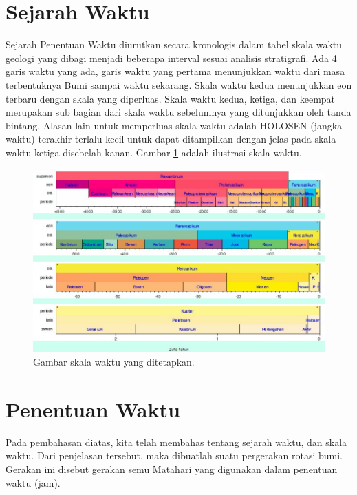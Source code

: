 

\section{Sejarah Waktu}

Sejarah Penentuan Waktu diurutkan secara kronologis dalam tabel skala waktu geologi 
yang dibagi menjadi beberapa interval sesuai analisis stratigrafi. 
Ada 4 garis waktu yang ada, garis waktu yang pertama menunjukkan waktu dari masa terbentuknya Bumi sampai waktu sekarang\cite{suryasejarah}.  Skala waktu kedua menunjukkan eon terbaru dengan skala yang diperluas. Skala waktu kedua, ketiga, dan keempat merupakan sub bagian dari skala waktu sebelumnya yang ditunjukkan oleh tanda bintang. 
Alasan lain untuk memperluas skala waktu adalah HOLOSEN (jangka waktu) terakhir terlalu kecil untuk dapat ditampilkan dengan jelas
pada skala waktu ketiga disebelah kanan. Gambar \ref{sejarahpenentuan} adalah ilustrasi skala waktu.

\begin{figure}[ht]
\centerline{\includegraphics[width=1\textwidth]{figures/sejarahpenentuan.JPG}}
\caption{Gambar skala waktu yang ditetapkan.}
\label{sejarahpenentuan}
\end{figure}

\section{Penentuan Waktu}
Pada pembahasan diatas, kita telah membahas tentang sejarah waktu, dan skala waktu. 
Dari penjelasan tersebut, maka dibuatlah suatu pergerakan rotasi bumi. 
Gerakan ini disebut gerakan semu Matahari yang digunakan dalam penentuan waktu (jam).

